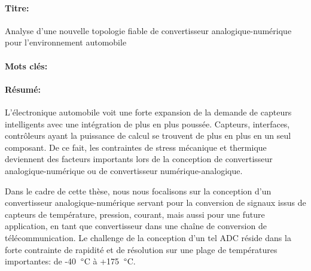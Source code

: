\vspace{-0.5cm}
\begin{mdframed}[linecolor=Prune,linewidth=1]
    \vspace{-.25cm}
    \paragraph*{Titre:} 
    Analyse d'une nouvelle topologie fiable de convertisseur analogique-numérique pour \newline l'environnement automobile
    \vspace{-.25cm}
    \paragraph*{Mots clés:} 
    
    \vspace{-.5cm}
    \paragraph*{Résumé:} 
    L'électronique automobile voit une forte expansion de la demande de capteurs intelligents avec une intégration de plus en plus poussée. Capteurs, interfaces, contrôleurs ayant la puissance de calcul se trouvent de plus en plus en un seul composant. De ce fait, les contraintes de stress mécanique et thermique deviennent des facteurs importants lors de la conception de convertisseur analogique-numérique ou de convertisseur numérique-analogique.
    
    Dans le cadre de cette thèse, nous nous focalisons sur la conception d'un convertisseur analogique-numérique servant pour la conversion de signaux issus de capteurs de température, pression, courant, mais aussi pour une future application, en tant que convertisseur dans une chaîne de conversion de télécommunication. Le challenge de la conception d'un tel ADC réside dans la forte contrainte de rapidité et de résolution sur une plage de températures importantes: de -40 $\degree$C à +175 $\degree$C.
    

\end{mdframed}
